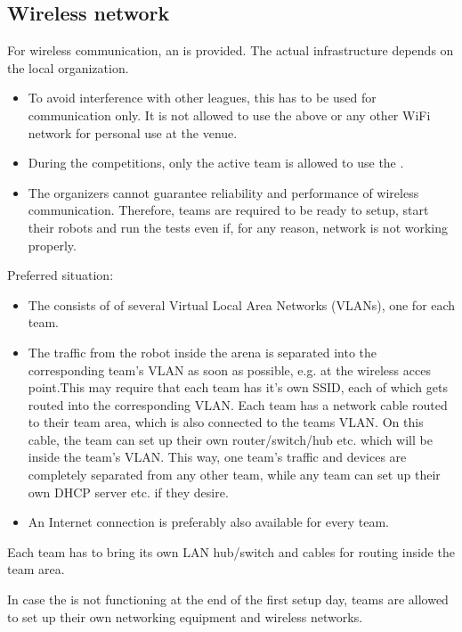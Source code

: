 \subsection{Wireless network}
\label{rule:scenario_wifi}

For wireless communication, an  is provided. The actual infrastructure depends on the local organization. 

\begin{itemize}
	\item To avoid interference with other leagues, this  has to be used for communication only. It is not allowed to use the above or any other WiFi network for personal use at the venue.
	\item During the competitions, only the active team is allowed to use the . 
	\item The organizers cannot guarantee reliability and performance of wireless communication. Therefore, teams are required to be ready to setup, start their robots and run the tests even if, for any reason, network is not working properly.
\end{itemize}

Preferred situation:
\begin{itemize}
	\item The  consists of of several Virtual Local Area Networks (VLANs), one for each team. 
	\item The traffic from the robot inside the arena is separated into the corresponding team's VLAN as soon as possible, e.g. at the wireless acces point.This may require that each team has it's own SSID, each of which gets routed into the corresponding VLAN. Each team has a network cable routed to their team area, which is also connected to the teams VLAN. On this cable, the team can set up their own router/switch/hub etc. which will be inside the team's VLAN. This way, one team's traffic and devices are completely separated from any other team, while any team can set up their own DHCP server etc. if they desire. 
	\item An Internet connection is preferably also available for every team. 
\end{itemize}
Each team has to bring its own LAN hub/switch and cables for routing inside the team area. 

In case the  is not functioning at the end of the first setup day, teams are allowed to set up their own networking equipment and wireless networks.

